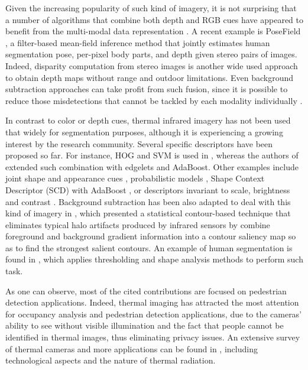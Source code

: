 \documentclass[10pt,twocolumn,letterpaper]{article}
\begin{document}
Given the increasing popularity of such kind of imagery, it is not surprising that a number of algorithms that combine both depth and RGB cues have appeared to benefit from the multi-modal data representation \cite{stefanczyk2012multimodal,  clapes2012user, sheasby2012simultaneous, hernandez2012bovdw, teichman2013learning, scharwachter2013efficient, sheasby2013robust, alahari2013pose}. A recent example is PoseField \cite{vineet2013posefield}, a filter-based mean-field inference method that jointly estimates human segmentation pose, per-pixel body parts, and depth given stereo pairs of images. Indeed, disparity computation from stereo images is another wide used approach to obtain depth maps without range and outdoor limitations. Even background subtraction approaches can take profit from such fusion, since it is possible to reduce those misdetections that cannot be tackled by each modality individually \cite{gordon1999background, camplani2014background}. 
 
 In contrast to color or depth cues, thermal infrared imagery has not been used that widely for segmentation purposes, although it is experiencing a growing interest by the research community. Several specific descriptors have been proposed so far. For instance, HOG and SVM is used in \cite{suard2006pedestrian}, whereas the authors of \cite{zhang2007pedestrian} extended such combination with edgelets and AdaBoost. Other examples include joint shape and appearance cues \cite{dai2007pedestrian}, probabilistic models \cite{bertozzi2007pedestrian}, Shape Context Descriptor (SCD) with AdaBoost \cite{wang2010improved}, or descriptors invariant to scale, brightness and contrast \cite{olmeda2012contrast}. Background subtraction has been also adapted to deal with this kind of imagery in \cite{davis2004robust}, which presented a statistical contour-based technique that eliminates typical halo artifacts produced by infrared sensors by combine foreground and background gradient information into a contour saliency map so as to find the strongest salient contours. An example of human segmentation is found in \cite{fernandez2011real}, which applies thresholding and shape analysis methods to perform such task.

As one can observe, most of the cited contributions are focused on pedestrian detection applications. Indeed, thermal imaging has attracted the most attention for occupancy analysis \cite{gade2013long} and pedestrian detection applications, due to the cameras' ability to see without visible illumination and the fact that people cannot be identified in thermal images, thus eliminating privacy issues. An extensive survey of thermal cameras and more applications can be found in \cite{gade2014thermal}, including technological aspects and the nature of thermal radiation. 
\end{document}
